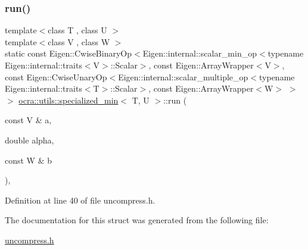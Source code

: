 \subsubsection{\texorpdfstring{run()}{run()}\hspace{0.1cm}{\footnotesize\ttfamily [2/2]}}
{\footnotesize\ttfamily template$<$class T , class U $>$ \\
template$<$class V , class W $>$ \\
static const Eigen\+::\+Cwise\+Binary\+Op$<$Eigen\+::internal\+::scalar\+\_\+min\+\_\+op$<$typename Eigen\+::internal\+::traits$<$V$>$\+::Scalar$>$, const Eigen\+::\+Array\+Wrapper$<$V$>$, const Eigen\+::\+Cwise\+Unary\+Op$<$Eigen\+::internal\+::scalar\+\_\+multiple\+\_\+op$<$typename Eigen\+::internal\+::traits$<$T$>$\+::Scalar$>$, const Eigen\+::\+Array\+Wrapper$<$W$>$ $>$ $>$ \hyperlink{structocra_1_1utils_1_1specialized__min}{ocra\+::utils\+::specialized\+\_\+min}$<$ T, U $>$\+::run (\begin{DoxyParamCaption}\item[{const V \&}]{a,  }\item[{double}]{alpha,  }\item[{const W \&}]{b }\end{DoxyParamCaption})\hspace{0.3cm}{\ttfamily [inline]}, {\ttfamily [static]}}



Definition at line 40 of file uncompress.\+h.



The documentation for this struct was generated from the following file\+:\begin{DoxyCompactItemize}
\item 
\hyperlink{uncompress_8h}{uncompress.\+h}\end{DoxyCompactItemize}
